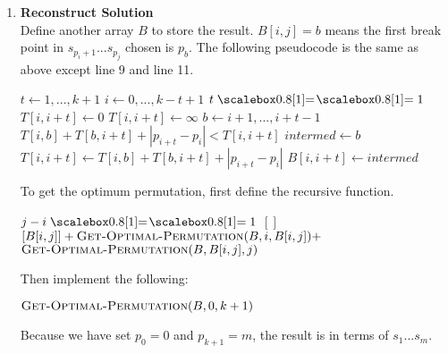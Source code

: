 \documentclass[11pt]{article}
\begin{document}
\begin{enumerate}[label=(\alph*)]
\begin{codebox}
\end{codebox}

\item {\bf Reconstruct Solution}\\
Define another array $B$ to store the result. $B[i, j] = b$ means the first break point in $s_{p_i+1}...s_{p_j}$ chosen is $p_b$. The following pseudocode is the same as above except line 9 and line 11.

\begin{codebox}
\li \For $t \gets 1, ..., k+1$
\li     \Then \For $i \gets 0, ..., k - t+ 1$
\li               \Then \If $t \isequal 1$
\li                        \Then $T[i, i + t] \gets 0$
\li                     \Else
\li                          $T[i, i + t] \gets \infty$                         
\li                          \For $b \gets i + 1, ..., i+t-1$ 
\li                               \Then \If $T[i, b] + T[b, i +t] + |p_{i + t}- p_i| < T[i, i + t]$
\li                                         \Then    $intermed \gets b$
\li                                                  $T[i, i + t] \gets T[i, b] + T[b, i +t] + |p_{i + t}- p_i|$\End\End
\li                                      $B[i, i + t] \gets intermed$

\end{codebox}

To get the optimum permutation, first define the recursive function.

\begin{codebox}
\li \If $j - i \isequal 1$
\li     \Then \Return $[]$
\li \Else
\li     \Return $[B[i, j]] + \textnormal{\scshape Get-Optimal-Permutation}(B, i, B[i, j]) + $\zi $\textnormal{\scshape Get-Optimal-Permutation}(B, B[i, j], j)$
\end{codebox}

Then implement the following:
\begin{codebox}
\li \Return $\textnormal{\scshape Get-Optimal-Permutation}(B, 0, k + 1)$
\end{codebox}
Because we have set $p_0 = 0$ and $p_{k+1} = m$, the result is in terms of $s_1...s_m.$



\end{enumerate}
\end{document}
